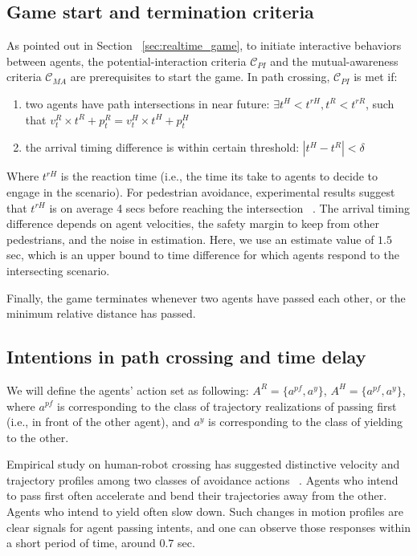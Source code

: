 \documentclass[letterpaper, 10 pt, conference]{ieeeconf}  %
\begin{document}
\subsection{Game start and termination criteria}
As pointed out in Section ~\ref{sec:realtime_game}, to initiate interactive 
behaviors between agents, the potential-interaction criteria $\mathcal{C}_{PI}$ 
and the mutual-awareness criteria $\mathcal{C}_{MA}$ are prerequisites to start the 
game. In path crossing, $\mathcal{C}_{PI}$ is met if:
\begin{enumerate}
  \item two agents have path intersections in near future: 
    $\exists t^H<t^{rH}, t^R<t^{rR}$, such that $v^R_t \times t^R + p^R_t = v^H_t \times t^H +p^H_t$
  \item the arrival timing difference is within certain threshold: $|t^H-t^R|<\delta$
\end{enumerate}
Where $t^{rH}$ is the reaction time (i.e., the time its take to agents to decide to 
engage in the scenario). For pedestrian avoidance, experimental results suggest 
that $t^{rH}$ is on average 4 secs before reaching the intersection ~\cite{pettre2009experiment}. The arrival timing difference depends on agent velocities, the safety margin to keep from other pedestrians, and the noise in estimation. Here, we use an estimate value of $1.5$ sec, which is an upper bound to time difference for which agents respond to the intersecting scenario.

Finally, the game terminates whenever two agents have passed each other, or the minimum relative distance has passed.

\subsection{Intentions in path crossing and time delay}

We will define the agents' action set as following: $A^R = \{a^{pf}, a^y\}$, $A^H = \{a^{pf},a^y\}$, where $a^{pf}$ is corresponding to the class of trajectory realizations of passing first (i.e., in front of the other agent), and $a^y$ is corresponding to the class of yielding to the other. 

Empirical study on human-robot crossing has suggested distinctive velocity and trajectory profiles among two classes of avoidance actions ~\cite{paris2007pedestrian}. Agents who intend to pass first often accelerate and bend their trajectories away from the other. Agents who intend to yield often slow down. Such changes in motion profiles are clear signals for agent passing intents, and one can observe those responses within a short period of time, around $0.7$ sec.
\end{document}
